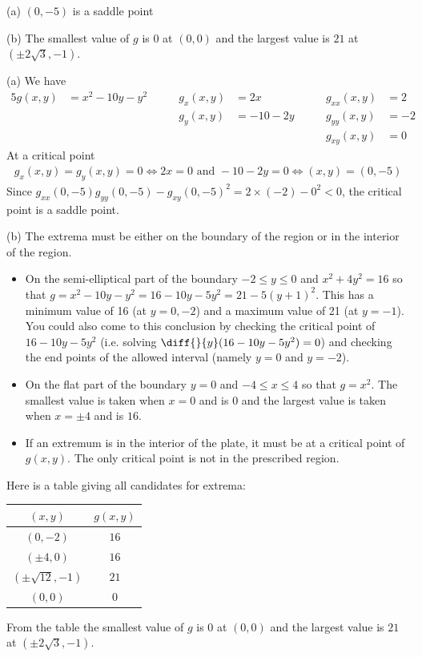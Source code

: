 %

\begin{answer}
(a) $(0,-5)$ is a saddle point

(b) The smallest value of $g$ is $0$ at $(0,0)$
and the largest value is $21$ at $(\pm 2\sqrt{3},-1)$.
\end{answer}

\begin{solution}
(a)
We have
\begin{alignat*}{5}
g(x,y)&=x^2-10y-y^2 \qquad&
g_x(x,y)&=2x \qquad&
g_{xx}(x,y)&=2\\
 & & g_y(x,y)&=-10-2y\qquad &
g_{yy}(x,y)&=-2 \\
 & & & &g_{xy}(x,y)&=0
\end{alignat*}
At a critical point
\begin{align*}
g_x(x,y)=g_y(x,y)=0
\iff 2x=0\text{ and }-10-2y=0
\iff (x,y)=(0,-5)
\end{align*}
Since $g_{xx}(0,-5)g_{yy}(0,-5)-g_{xy}(0,-5)^2=2\times(-2)-0^2<0$,
the critical point is a saddle point.

(b)
The extrema must be either on the boundary of the region
or in the interior of the region. 
\begin{itemize}
\item 
On the semi-elliptical part of the boundary $-2\le y\le 0$ 
and $x^2+4y^2=16$ so that $g=x^2-10y-y^2=16-10y-5y^2=21-5(y+1)^2$. This has 
a minimum value of 16 (at $y=0,-2$) and a maximum value of 21 (at $y=-1$).
You could also come to this conclusion by checking the critical point
of  $16-10y-5y^2$ (i.e. solving $\diff{}{y}(16-10y-5y^2)=0$)
and checking the end points of the allowed interval (namely $y=0$ and $y=-2$).

\item 
On the flat part of the boundary $y=0$ and
$-4\le x\le 4$ so that $g=x^2$.  
The smallest value is taken when $x=0$ and is $0$ and the largest value
is taken when $x=\pm 4$ and is $16$.
\item 
If an extremum is in the interior of the plate,
it must be at a critical point of $g(x,y)$. The only critical point is
not in the prescribed region.
\end{itemize}
Here is a table giving all candidates for extrema:
\begin{center}
\renewcommand{\arraystretch}{1.3}
     \begin{tabular}{|c|c|}
     \hline
       $(x,y)$  & $g(x,y)$ \\ \hline
       $(0,-2)$ & $16$ \\ \hline
       $(\pm 4,0)$ & $16$ \\ \hline
       $(\pm \sqrt{12},-1)$ & $21$ \\ \hline 
       $(0,0)$  & $0$ \\ \hline
     \end{tabular}
\renewcommand{\arraystretch}{1.0}
\end{center}
From the table the smallest value of $g$ is $0$ at $(0,0)$
and the largest value is $21$ at $(\pm 2\sqrt{3},-1)$.
\end{solution}

